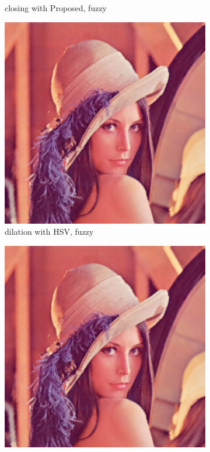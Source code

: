 \begin{figure}[!ht]
\begin{subfigure}[t]{0.22\textwidth}
    \caption{closing with Proposed, fuzzy}
    \centering
  \end{subfigure}
\begin{subfigure}[t]{0.22\textwidth}
    \includegraphics[width=0.9\linewidth]{../project/images/outputs/compare_order/dilation_HSV_fuzzy.png}
    \caption{dilation with HSV, fuzzy}
    \centering
  \end{subfigure}
\begin{subfigure}[t]{0.22\textwidth}
    \includegraphics[width=0.9\linewidth]{../project/images/outputs/compare_order/erosion_HSV_fuzzy.png}

\end{subfigure}
\end{figure}
